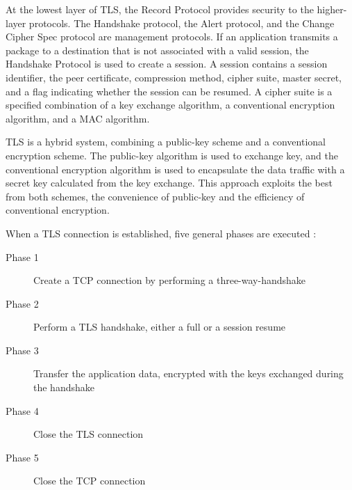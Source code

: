 \documentclass[12pt,a4paper,titlepage]{report}
\begin{document}
At the lowest layer of TLS, the Record Protocol provides security to the higher-layer protocols. The Handshake protocol, the Alert protocol, and the Change Cipher Spec protocol are management protocols. If an application transmits a package to a destination that is not associated with a valid session, the Handshake Protocol is used to create a session. A session contains a session identifier, the peer certificate, compression method, cipher suite, master secret, and a flag indicating whether the session can be resumed. A cipher suite is a specified combination of a key exchange algorithm, a conventional encryption algorithm, and a MAC algorithm.  \cite{rfc2246}

TLS is a hybrid system, combining a public-key scheme and a conventional encryption scheme. The public-key algorithm is used to exchange key, and the conventional encryption algorithm is used to encapsulate the data traffic with a secret key calculated from the key exchange. This approach exploits the best from both schemes, the convenience of public-key and the efficiency of conventional encryption.

When a TLS connection is established, five general phases are executed \cite{berbecaru}:
\begin{description}
\item[Phase 1] {Create a TCP connection by performing a three-way-handshake}
\item[Phase 2] {Perform a TLS handshake, either a full or a session resume}
\item[Phase 3] {Transfer the application data, encrypted with the keys exchanged during the handshake}
\item[Phase 4] {Close the TLS connection}
\item[Phase 5] {Close the TCP connection}
\end{description}
\end{document}
